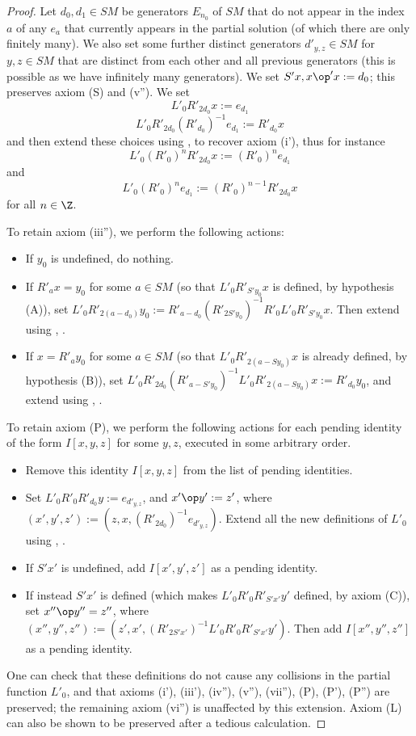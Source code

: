 \begin{proof}\leanok  Let $d_0, d_1 \in SM$ be generators $E_{n_0}$ of $SM$ that do not appear in the index $a$ of any $e_a$ that currently appears in the partial solution (of which there are only finitely many).  We also set some further distinct generators $d'_{y,z} \in SM$ for $y,z \in SM$ that are distinct from each other and all previous generators (this is possible as we have infinitely many generators).  We set $S'x,  x \op' x := d_0$; this preserves axiom (S) and (v'').  We set
$$ L'_0 R'_{2d_0} x := e_{d_1}$$
$$ L'_0 R'_{2d_0} (R'_{d_0})^{-1} e_{d_1} := R'_{d_0} x$$
and then extend these choices using ,  to recover axiom (i'), thus for instance
$$ L'_0 (R'_0)^n R'_{2d_0} x := (R'_0)^n e_{d_1}$$
and
$$ L'_0 (R'_0)^n e_{d_1}  := (R'_0)^{n-1} R'_{2d_0} x$$
for all $n \in \Z$.

To retain axiom (iii''), we perform the following actions:
\begin{itemize}
\item If $y_0$ is undefined, do nothing.
\item If $R'_a x = y_0$ for some $a \in SM$ (so that $L'_0 R'_{S'y_0} x$ is defined, by hypothesis (A)), set $L'_0 R'_{2(a-d_0)} y_0 := R'_{a-d_0} (R'_{2S'y_0})^{-1} R'_0 L'_0 R'_{S'y_0} x$. Then extend using , .
\item If $x = R'_a y_0$ for some $a \in SM$ (so that $L'_0 R'_{2(a-Sy_0)} x$ is already defined, by hypothesis (B)), set $L'_0 R'_{2d_0} (R'_{a-S'y_0})^{-1} L'_0 R'_{2(a-Sy_0)} x :=R'_{d_0} y_0$, and extend using , .
\end{itemize}
To retain axiom (P), we perform the following actions for each pending identity of the form $I[x,y,z]$ for some $y,z$, executed in some arbitrary order.
\begin{itemize}
\item Remove this identity $I[x,y,z]$ from the list of pending identities.
\item Set $L'_0 R'_0 R'_{d_0} y := e_{d'_{y,z}}$, and $x' \op y' := z'$, where $(x',y',z') := (z, x, (R'_{2d_0})^{-1} e_{d'_{y,z}})$. Extend all the new definitions of $L'_0$ using , .
\item If $S'x'$ is undefined, add $I[x',y',z']$ as a pending identity.
\item If instead $S'x'$ is defined (which makes $L'_0 R'_0 R'_{S'x'} y'$ defined, by axiom (C)), set $x'' \op y'' = z''$, where $(x'',y'',z'') := (z', x', (R'_{2S'x'})^{-1} L'_0 R'_0 R'_{S'x'} y')$.  Then add $I[x'',y'',z'']$ as a pending identity.
\end{itemize}
One can check that these definitions do not cause any collisions in the partial function $L'_0$, and that axioms (i'), (iii'), (iv''), (v''), (vii''), (P), (P'), (P'') are preserved; the remaining axiom (vi'') is unaffected by this extension.  Axiom (L) can also be shown to be preserved after a tedious calculation.
\end{proof}



